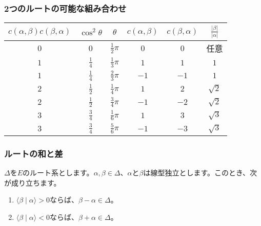 \documentclass{beamer}
\begin{document}
\begin{frame}
    \frametitle{2つのルートの可能な組み合わせ}

    \begin{table}
        \renewcommand{\arraystretch}{1.8}
        \centering
        \begin{tabular}{cccccc}
            $c(α,β)c(β,α)$ & $\cos^2θ$     & $θ$            & $c(α,β)$ & $c(β,α)$ & $\frac{|β|}{|α|}$ \\
            \hline
            $0$            & $0$           & $\frac{1}{2}π$ & $0$      & $0$      & 任意                \\
            $1$            & $\frac{1}{4}$ & $\frac{1}{3}π$ & $1$      & $1$      & $1$               \\
            $1$            & $\frac{1}{4}$ & $\frac{2}{3}π$ & $-1$     & $-1$     & $1$               \\
            $2$            & $\frac{1}{2}$ & $\frac{1}{4}π$ & $1$      & $2$      & $\sqrt{2}$        \\
            $2$            & $\frac{1}{2}$ & $\frac{3}{4}π$ & $-1$     & $-2$     & $\sqrt{2}$        \\
            $3$            & $\frac{3}{4}$ & $\frac{1}{6}π$ & $1$      & $3$      & $\sqrt{3}$        \\
            $3$            & $\frac{3}{4}$ & $\frac{5}{6}π$ & $-1$     & $-3$     & $\sqrt{3}$
        \end{tabular}
    \end{table}
\end{frame}

\begin{frame}
    \frametitle{ルートの和と差}

    \begin{theorem}
        $Δ$を$E$のルート系とします。$α,β∈Δ$、$α$と$β$は線型独立とします。このとき、次が成り立ちます。
        \begin{enumerate}
            \item $⟨β∣α⟩>0$ならば、$β-α∈Δ$。
            \item $⟨β∣α⟩<0$ならば、$β+α∈Δ$。
        \end{enumerate}
    \end{theorem}

    \begin{figure}
        \quad
    \end{figure}
\end{frame}
\end{document}
